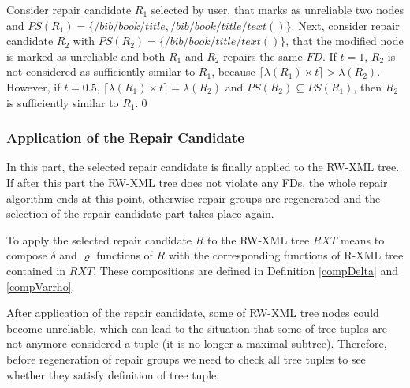 \begin{example}\label{tresholdExample}
Consider repair candidate $R_1$ selected by user, that marks as unreliable two nodes and $PS(R_1) = \{/bib/book/title, /bib/book/title/text()\}$. Next, consider repair candidate $R_2$ with $PS(R_2) = \{/bib/book/title/text()\}$, that the modified node is marked as unreliable and both $R_1$ and $R_2$ repairs the same $FD$. If $t=1$, $R_2$ is not considered as sufficiently similar to $R_1$, because $\lceil\lambda(R_1) \times t\rceil > \lambda(R_2)$. However, if $t=0.5$, $\lceil\lambda(R_1) \times t\rceil = \lambda(R_2)$ and $PS(R_2) \subseteq PS(R_1)$, then $R_2$ is sufficiently similar to $R_1$.\qed
\end{example}

\subsubsection{Application of the Repair Candidate}

In this part, the selected repair candidate is finally applied to the RW-XML tree. If after this part the RW-XML tree does not violate any FDs, the whole repair algorithm ends at this point, otherwise repair groups are regenerated and the selection of the repair candidate part takes place again.

To apply the selected repair candidate $R$ to the RW-XML tree $RXT$ means to compose $\delta$ and $\varrho$ functions of $R$ with the corresponding functions of R-XML tree contained in $RXT$. These compositions are defined in Definition \ref{compDelta} and \ref{compVarrho}.

After application of the repair candidate, some of RW-XML tree nodes could become unreliable, which can lead to the situation that some of tree tuples are not anymore considered a tuple (it is no longer a maximal subtree). Therefore, before regeneration of repair groups we need to check all tree tuples to see whether they satisfy definition of tree tuple.
